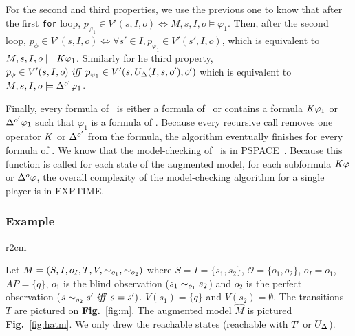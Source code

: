 For the second and third properties, we use the previous one to know that after the first \texttt{for} loop, $p_{\varphi_1}\in V'(s,I,o)\iff M,s,I,o\models\varphi_1$. Then, after the second loop, $p_{\phi}\in V'(s,I,o)\iff \forall s'\in I, p_{\varphi_1}\in V'(s',I,o)$, which is equivalent to $M,s,I,o\models\mathit{K}\varphi_1$.
Similarly for he third property, $p_{\phi}\in V'(s,I,o)\ \mathit{iff}\  p_{\varphi_1}\in V'(s,U_{\Delta}(I,s,o'),o')$ which is equivalent to $M,s,I,o\models\Delta^{o'}\varphi_1$.

Finally, every formula of \ctlskd\ is either a formula of \ctls\ or contains a formula $\mathit{K}\varphi_1$ or $\Delta^{o'}\varphi_1$ such that $\varphi_1$ is a formula of \ctls. Because every recursive call removes one operator $\mathit{K}$ or $\Delta^{o'}$ from the formula, the algorithm eventually finishes for every formula of \ctlskd.
 We know that the model-checking of \ctls\ is in PSPACE~\cite{DBLP:conf/popl/ClarkeES83}. Because this function is called for each state of the augmented model, for each subformula $\mathit{K}\varphi$ or $\Delta^{o}\varphi$, the overall complexity of the model-checking algorithm for a single player is in EXPTIME.


\subsubsection{Example}

\begin{wrapfigure}{r}{2cm}
  \centering
    \caption{$M$}
    \label{fig:m}
\end{wrapfigure}

Let $M=(S,I,o_I,T,V,\sim_{o_1},\sim_{o_2})$ where $S=I=\{s_1,s_2\}$, $\mathcal{O}=\{o_1,o_2\}$, $o_I=o_1$, $AP=\{q\}$, $o_1$ is the blind observation ($s_1\sim_{o_1}s_2$) and $o_2$ is the perfect observation ($s\sim_{o_2}s'\ \mathit{iff}\  s=s')$. $V(s_1)=\{q\}$ and $V(s_2)=\emptyset$. The transitions $T$ are pictured on \textbf{Fig.}~\ref{fig:m}. The augmented model $\hat{M}$ is pictured \textbf{Fig.}~\ref{fig:hatm}. We only drew the reachable states (reachable with $T'$ or $U_{\Delta}$).

